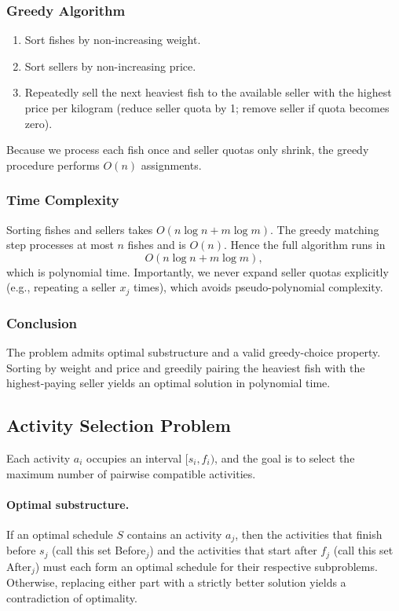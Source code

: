 \documentclass[9pt]{extarticle}
\begin{document}
\subsubsection*{Greedy Algorithm}
\begin{enumerate}
    \item Sort fishes by non-increasing weight.
    \item Sort sellers by non-increasing price.
    \item Repeatedly sell the next heaviest fish to the available seller with the
          highest price per kilogram (reduce seller quota by 1; remove seller if
          quota becomes zero).
\end{enumerate}
Because we process each fish once and seller quotas only shrink, the greedy
procedure performs \(O(n)\) assignments.

\subsubsection*{Time Complexity}
Sorting fishes and sellers takes \(O(n \log n + m \log m)\). The greedy matching
step processes at most \(n\) fishes and is \(O(n)\). Hence the full algorithm runs in
\[
O(n \log n + m \log m),
\]
which is polynomial time. Importantly, we never expand seller quotas explicitly
(e.g., repeating a seller \(x_j\) times), which avoids pseudo-polynomial complexity.

\subsubsection*{Conclusion}
The problem admits optimal substructure and a valid greedy-choice property.
Sorting by weight and price and greedily pairing the heaviest fish with the
highest-paying seller yields an optimal solution in polynomial time.

\subsection{Activity Selection Problem}

Each activity $a_i$ occupies an interval $[s_i,f_i)$, and the goal is to select
the maximum number of pairwise compatible activities.

\paragraph{Optimal substructure.}
If an optimal schedule $S$ contains an activity $a_j$, then the activities that
finish before $s_j$ (call this set Before$_j$) and the activities that start
after $f_j$ (call this set After$_j$) must each form an optimal schedule for
their respective subproblems.  Otherwise, replacing either part with a strictly
better solution yields a contradiction of optimality.
\end{document}
